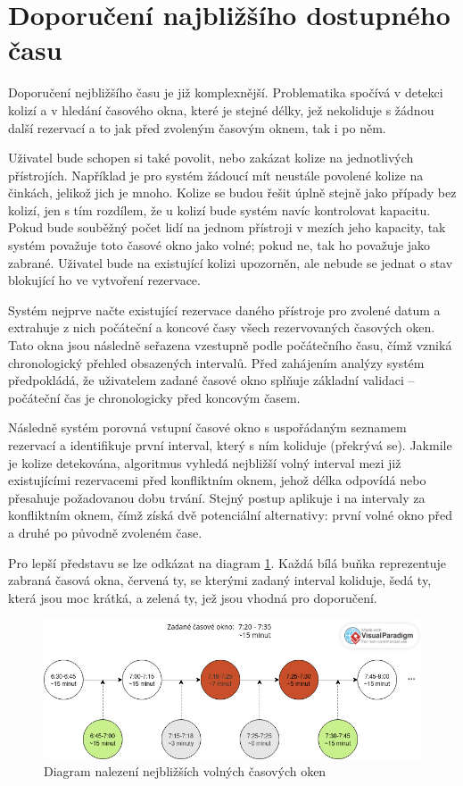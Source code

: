 \section{Doporučení najbližšího dostupného času}
Doporučení nejbližšího času je již komplexnější. Problematika spočívá v detekci kolizí a v hledání časového okna, které je stejné délky, jež nekoliduje s žádnou další rezervací a to jak před zvoleným časovým oknem, tak i po něm.

Uživatel bude schopen si také povolit, nebo zakázat kolize na jednotlivých přístrojích. Například je pro systém žádoucí mít neustále povolené kolize na činkách, jelikož jich je mnoho. Kolize se budou řešit úplně stejně jako případy bez kolizí, jen s tím rozdílem, že u kolizí bude systém navíc kontrolovat kapacitu. Pokud bude souběžný počet lidí na jednom přístroji v mezích jeho kapacity, tak systém považuje toto časové okno jako volné; pokud ne, tak ho považuje jako zabrané. Uživatel bude na existující kolizi upozorněn, ale nebude se jednat o stav blokující ho ve vytvoření rezervace.

Systém nejprve načte existující rezervace daného přístroje pro zvolené datum a extrahuje z nich počáteční a koncové časy všech rezervovaných časových oken. Tato okna jsou následně seřazena vzestupně podle počátečního času, čímž vzniká chronologický přehled obsazených intervalů. Před zahájením analýzy systém předpokládá, že uživatelem zadané časové okno splňuje základní validaci – počáteční čas je chronologicky před koncovým časem.

Následně systém porovná vstupní časové okno s uspořádaným seznamem rezervací a identifikuje první interval, který s ním koliduje (překrývá se). Jakmile je kolize detekována, algoritmus vyhledá nejbližší volný interval mezi již existujícími rezervacemi před konfliktním oknem, jehož délka odpovídá nebo přesahuje požadovanou dobu trvání. Stejný postup aplikuje i na intervaly za konfliktním oknem, čímž získá dvě potenciální alternativy: první volné okno před a druhé po původně zvoleném čase.

Pro lepší představu se lze odkázat na diagram \ref{fig:ReservationTimeSuggestionDiagram}. Každá bílá buňka reprezentuje zabraná časová okna, červená ty, se kterými zadaný interval koliduje, šedá ty, která jsou moc krátká, a zelená ty, jež jsou vhodná pro doporučení. 

\begin{figure}
    \centering
    \includegraphics[width=1\textwidth]{Figures/time_suggestion_diagram.jpg}
    \caption{Diagram nalezení nejbližších volných časových oken}
    \label{fig:ReservationTimeSuggestionDiagram}
\end{figure}

